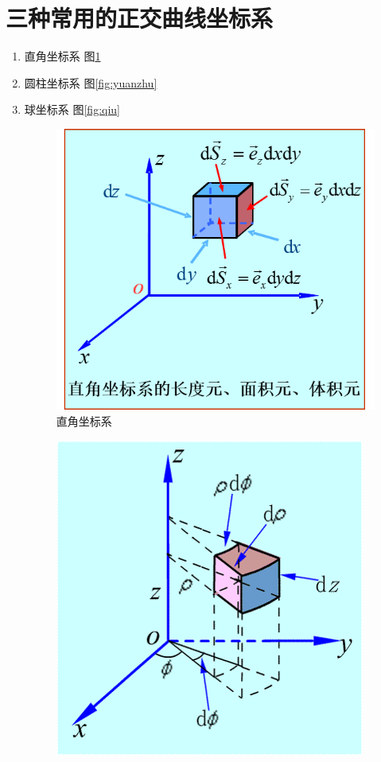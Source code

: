 \section{三种常用的正交曲线坐标系}
\begin{enumerate}
	\item 直角坐标系 图\ref{fig:zhijiao}
	\item 圆柱坐标系 图\ref{fig:yuanzhu}
	\item 球坐标系	图\ref{fig:qiu}
		\begin{figure}
			\centering
			\includegraphics[keepaspectratio]{pics/直角坐标系}
			\caption{直角坐标系}
			\label{fig:zhijiao}
		\end{figure}
		\begin{figure}
			\centering
			\includegraphics[keepaspectratio]{pics/圆柱坐标系}

\end{figure}
\end{enumerate}
